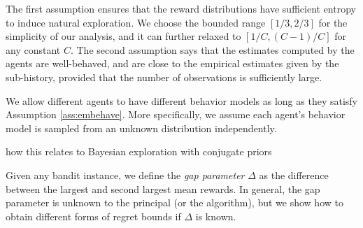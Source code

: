 The first assumption ensures that the reward distributions have
sufficient entropy to induce natural exploration. We choose the
bounded range $[1/3, 2/3]$ for the simplicity of our analysis, and it
can further relaxed to $[1/C, (C-1)/C]$ for any constant $C$. The
second assumption says that the estimates computed by the agents are
well-behaved, and are close to the empirical estimates given by the
sub-history, provided that the number of observations is sufficiently
large.


We allow different agents to have different behavior models as long as
they satisfy Assumption \ref{ass:embehave}. More specifically, we
assume each agent's behavior model is sampled from an unknown
distribution independently.
\begin{remark}
  how this relates to Bayesian exploration with conjugate
  priors 
\end{remark}

Given any bandit instance, we define the \emph{gap parameter} $\Delta$ as the difference between the largest and second largest mean rewards. In general, the gap parameter is unknown to the principal (or the algorithm), but we show how to obtain different forms of regret bounds if $\Delta$ is known.



